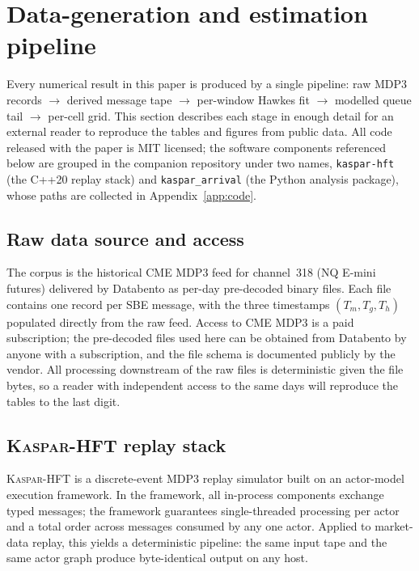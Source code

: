 \documentclass[11pt]{article}
\newcommand{\kasparhft}{\textsc{Kaspar-HFT}}
\begin{document}
\section{Data-generation and estimation pipeline}
\label{sec:pipeline}

Every numerical result in this paper is produced by a single pipeline: raw MDP3 records $\rightarrow$ derived message tape $\rightarrow$ per-window Hawkes fit $\rightarrow$ modelled queue tail $\rightarrow$ per-cell grid. This section describes each stage in enough detail for an external reader to reproduce the tables and figures from public data. All code released with the paper is MIT licensed; the software components referenced below are grouped in the companion repository under two names, \texttt{kaspar-hft} (the C++20 replay stack) and \texttt{kaspar\_arrival} (the Python analysis package), whose paths are collected in Appendix~\ref{app:code}.

\subsection{Raw data source and access}
\label{sec:pipeline-data}

The corpus is the historical CME MDP3 feed for channel~318 (NQ E-mini futures) delivered by Databento as per-day pre-decoded binary files. Each file contains one record per SBE message, with the three timestamps $(T_m, T_g, T_h)$ populated directly from the raw feed. Access to CME MDP3 is a paid subscription; the pre-decoded files used here can be obtained from Databento by anyone with a subscription, and the file schema is documented publicly by the vendor. All processing downstream of the raw files is deterministic given the file bytes, so a reader with independent access to the same days will reproduce the tables to the last digit.

\subsection{\kasparhft{} replay stack}
\label{sec:pipeline-kaspar}

\kasparhft{} \citep{mayeski_actorhft} is a discrete-event MDP3 replay simulator built on an actor-model execution framework. In the framework, all in-process components exchange typed messages; the framework guarantees single-threaded processing per actor and a total order across messages consumed by any one actor. Applied to market-data replay, this yields a deterministic pipeline: the same input tape and the same actor graph produce byte-identical output on any host.
\end{document}
